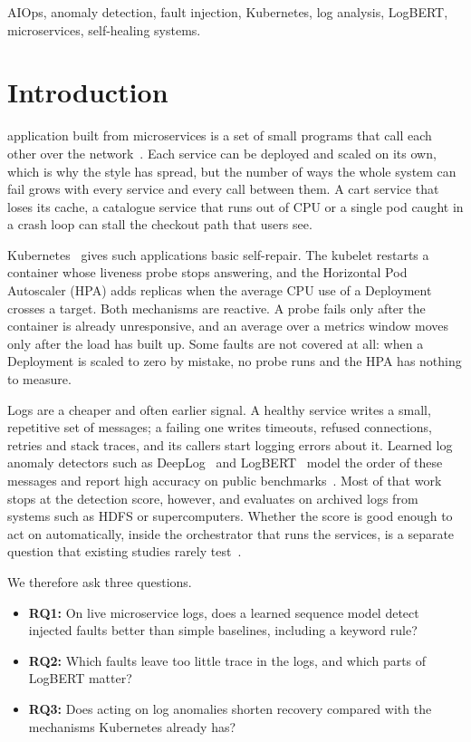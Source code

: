 \documentclass[journal]{IEEEtran}
\begin{document}
\begin{IEEEkeywords}
AIOps, anomaly detection, fault injection, Kubernetes, log analysis, LogBERT, microservices, self-healing systems.
\end{IEEEkeywords}

\section{Introduction}
 application built from microservices is a set of small programs that call each other over the network~\cite{dragoni2017}. Each service can be deployed and scaled on its own, which is why the style has spread, but the number of ways the whole system can fail grows with every service and every call between them. A cart service that loses its cache, a catalogue service that runs out of CPU or a single pod caught in a crash loop can stall the checkout path that users see.

Kubernetes~\cite{burns2016} gives such applications basic self-repair. The kubelet restarts a container whose liveness probe stops answering, and the Horizontal Pod Autoscaler (HPA) adds replicas when the average CPU use of a Deployment crosses a target. Both mechanisms are reactive. A probe fails only after the container is already unresponsive, and an average over a metrics window moves only after the load has built up. Some faults are not covered at all: when a Deployment is scaled to zero by mistake, no probe runs and the HPA has nothing to measure.

Logs are a cheaper and often earlier signal. A healthy service writes a small, repetitive set of messages; a failing one writes timeouts, refused connections, retries and stack traces, and its callers start logging errors about it. Learned log anomaly detectors such as DeepLog~\cite{du2017} and LogBERT~\cite{guo2021} model the order of these messages and report high accuracy on public benchmarks~\cite{he2016,zhu2023}. Most of that work stops at the detection score, however, and evaluates on archived logs from systems such as HDFS or supercomputers. Whether the score is good enough to act on automatically, inside the orchestrator that runs the services, is a separate question that existing studies rarely test~\cite{notaro2021,soldani2022}.

We therefore ask three questions.
\begin{itemize}
\item \textbf{RQ1:} On live microservice logs, does a learned sequence model detect injected faults better than simple baselines, including a keyword rule?
\item \textbf{RQ2:} Which faults leave too little trace in the logs, and which parts of LogBERT matter?
\item \textbf{RQ3:} Does acting on log anomalies shorten recovery compared with the mechanisms Kubernetes already has?
\end{itemize}
\end{document}
